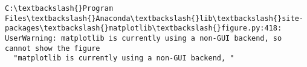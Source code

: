 \documentclass[11pt]{article}
\begin{document}
    \begin{Verbatim}[commandchars=\\\{\}]
C:\textbackslash{}Program Files\textbackslash{}Anaconda\textbackslash{}lib\textbackslash{}site-packages\textbackslash{}matplotlib\textbackslash{}figure.py:418: UserWarning: matplotlib is currently using a non-GUI backend, so cannot show the figure
  "matplotlib is currently using a non-GUI backend, "

    \end{Verbatim}

    \begin{center}
    \end{center}
    { \hspace*{\fill} \\}
    
    \begin{center}
    \end{center}
    { \hspace*{\fill} \\}
    
    \begin{center}
    \end{center}
    { \hspace*{\fill} \\}
    
\end{document}

